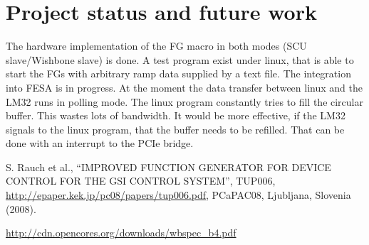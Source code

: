\documentclass[a4paper,
              ]{jacow}
\begin{document}
\section{Project status and future work}
The hardware implementation of the FG macro in both modes (SCU slave/Wishbone slave) is done. A test program exist under linux, that is able to start the FGs with arbitrary ramp data supplied by a text file. The integration into FESA is in progress.
At the moment the data transfer between linux and the LM32 runs in polling mode. The linux program constantly tries to fill the circular buffer. This wastes lots of bandwidth. It would be more effective, if the LM32 signals to the linux program, that the buffer needs to be refilled. That can be done with an interrupt to the PCIe bridge.


%
%
\iftrue   %
	\raggedend
\fi


\iffalse  %
	\newpage
	\printbibliography

\else
\begin{thebibliography}{9}   %

    S. Rauch et al., ``IMPROVED FUNCTION GENERATOR FOR
	 DEVICE CONTROL FOR THE GSI CONTROL SYSTEM'',
    TUP006, \url{http://epaper.kek.jp/pc08/papers/tup006.pdf}, PCaPAC08, Ljubljana, Slovenia (2008).

	\url{http://cdn.opencores.org/downloads/wbspec_b4.pdf}

\end{thebibliography}
\fi
\end{document}

